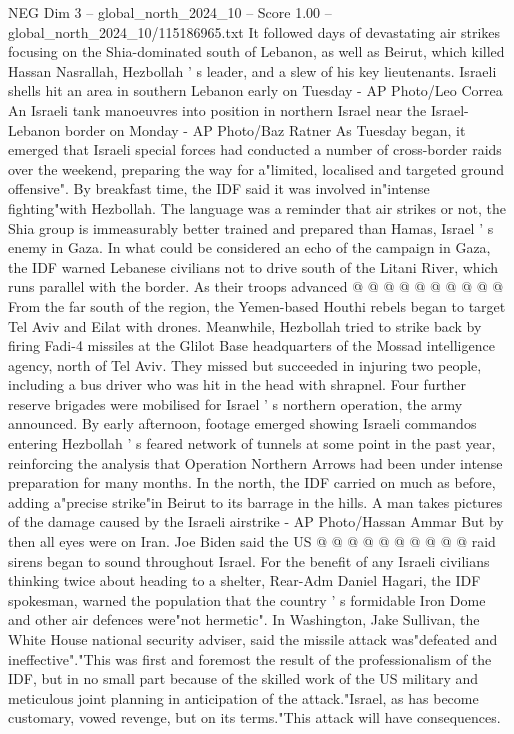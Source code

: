 \begin{textsample}{NEG Dim 3 – global\_north\_2024\_10 – Score 1.00 – global\_north\_2024\_10/115186965.txt}  \label{ex:f3_neg_310}
It followed days of devastating air strikes focusing on the Shia-dominated south of Lebanon, as well as Beirut, which killed Hassan Nasrallah, Hezbollah ' s leader, and a slew of his key lieutenants.
Israeli shells hit an area in southern Lebanon early on Tuesday - AP Photo/Leo Correa An Israeli tank manoeuvres into position in northern Israel near the Israel-Lebanon border on Monday - AP Photo/Baz Ratner As Tuesday began, it emerged that Israeli special forces had conducted a number of cross-border raids over the weekend, preparing the way for a"limited, localised and targeted ground offensive".
By breakfast time, the IDF said it was involved in"intense fighting"with Hezbollah.
The language was a reminder that air strikes or not, the Shia group is immeasurably better trained and prepared than Hamas, Israel ' s enemy in Gaza.
In what could be considered an echo of the campaign in Gaza, the IDF warned Lebanese civilians not to drive south of the Litani River, which runs parallel with the border.
As their troops advanced @ @ @ @ @ @ @ @ @ @ From the far south of the region, the Yemen-based Houthi rebels began to target Tel Aviv and Eilat with drones.
Meanwhile, Hezbollah tried to strike back by firing Fadi-4 missiles at the Glilot Base headquarters of the Mossad intelligence agency, north of Tel Aviv.
They missed but succeeded in injuring two people, including a bus driver who was hit in the head with shrapnel.
Four further reserve brigades were mobilised for Israel ' s northern operation, the army announced.
By early afternoon, footage emerged showing Israeli commandos entering Hezbollah ' s feared network of tunnels at some point in the past year, reinforcing the analysis that Operation Northern Arrows had been under intense preparation for many months.
In the north, the IDF carried on much as before, adding a"precise strike"in Beirut to its barrage in the hills.
A man takes pictures of the damage caused by the Israeli airstrike - AP Photo/Hassan Ammar But by then all eyes were on Iran.
Joe Biden said the US @ @ @ @ @ @ @ @ @ @ raid sirens began to sound throughout Israel.
For the benefit of any Israeli civilians thinking twice about heading to a shelter, Rear-Adm Daniel Hagari, the IDF spokesman, warned the population that the country ' s formidable Iron Dome and other air defences were"not hermetic".
In Washington, Jake Sullivan, the White House national security adviser, said the missile attack was"defeated and ineffective"."This was first and foremost the result of the professionalism of the IDF, but in no small part because of the skilled work of the US military and meticulous joint planning in anticipation of the attack."Israel, as has become customary, vowed revenge, but on its terms."This attack will have consequences.

\end{textsample}
